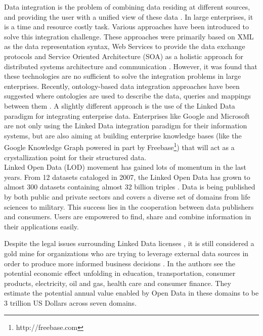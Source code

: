 \documentclass[onecolumn, crcready]{iosart2c}
\begin{document}
Data integration is the problem of combining data residing at different sources, and providing the user with a unified view of these data \cite{Lenzerini:2002:DIT:543613.543644}. In large enterprises, it is a time and resource costly task. Various approaches have been introduced to solve this integration challenge. These approaches were primarily based on XML as the data representation syntax, Web Services to provide the data exchange protocols and Service Oriented Architecture (SOA) as a holistic approach for distributed systems architecture and communication \cite{frischmuth2103a,frischmuth2012linked}. However, it was found that these technologies are no sufficient to solve the integration problems in large enterprises. Recently, ontology-based data integration approaches have been suggested where ontologies are used to describe the data, queries and mappings between them \cite{Wache01ontology-basedintegration}. A slightly different approach is the use of the Linked Data paradigm \cite{bizer_linked_2009} for integrating enterprise data. Enterprises like Google and Microsoft are not only using the Linked Data integration paradigm for their information systems, but are also aiming at building enterprise knowledge bases (like the Google Knowledge Graph powered in part by Freebase\footnote{http://freebase.com}) that will act as a crystallization point for their structured data.\\

Linked Open Data (LOD) movement has gained lots of momentum in the last years. From 12 datasets cataloged in 2007, the Linked Open Data has grown to almost 300 datasets containing almost 32 billion triples \cite{bizer2011}. Data is being published by both public and private sectors and covers a diverse set of domains from life sciences to military. This success lies in the cooperation between data publishers and consumers. Users are empowered to find, share and combine information in their applications easily.

Despite the legal issues surrounding Linked Data licenses \cite{nomoneyLOD}, it is still considered a gold mine for organizations who are trying to leverage external data sources in order to produce more informed business decisions \cite{Boyd2011}. In \cite{mckinseyreport} the authors see the potential economic effect unfolding in education, transportation, consumer products, electricity, oil and gas, health care and consumer finance. They estimate the potential annual value enabled by Open Data in these domains to be 3 trillion US Dollars across seven domains.
\end{document}
